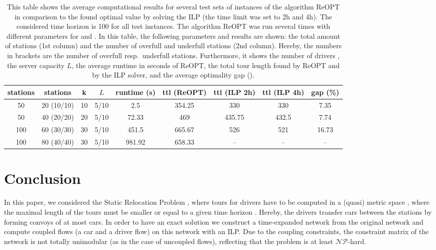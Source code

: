 \documentclass[english]{llncs}
\numberwithin{sublemma}{lemma}
\newcommand{\capd}{\ensuremath{L}}
\newcommand{\NPhard}{\ensuremath{\mathcal{NP}}\hbox{-}hard}
\begin{document}
\begin{table}
 \centering
 \caption{
    This table shows the average computational results for several test sets of instances of the algorithm ReOPT in comparison to the found optimal value by solving the ILP (the time limit was set to 2h and 4h).
    The considered time horizon is 100 for all test instances.
    The algorithm ReOPT was run several times with different parameters for  and .
    In this table, the following parameters and results are shown: the total amount of stations (1st column) and the number of overfull and underfull stations (2nd column).
    Hereby, the numbers in brackets are the number of overfull resp.~underfull stations.
    Furthermore, it shows the number of drivers , the server capacity \capd, the average runtime in seconds of ReOPT,
    the total tour length found by ReOPT and by the ILP solver, and the average optimality gap ().
 }
 \label{tab: computational results}
\begin{tabular}{c|c|c|c|c|c|c|c|c}
 stations & stations & k  & \capd  & runtime (s) & ttl (ReOPT) & ttl (ILP 2h) & ttl (ILP 4h) & gap (\%)  \\ \hline
 50       & 20 (10/10)    & 10 & 5/10 & 2.5        & 354.25      & 330      & 330      & 7.35      \\
 50       & 40 (20/20)    & 20 & 5/10 & 72.33      & 469         & 435.75   & 432.5    & 7.74      \\
 100      & 60 (30/30)    & 30 & 5/10 & 451.5      & 665.67      & 526      & 521      & 16.73     \\
 100      & 80 (40/40)    & 30 & 5/10 & 981.92     & 658.33      & --       & --       & --
\end{tabular}
\end{table}




\section{Conclusion}
\label{seq: conclusion}


In this paper, we considered the Static Relocation Problem ,
where tours for  drivers have to be computed in a (quasi) metric space , where the maximal length of the tours must be smaller or equal to a given time horizon .
Hereby, the drivers transfer cars between the stations by forming convoys of at most  cars.
In order to have an exact solution we construct a time-expanded network  from the original network  and compute coupled flows (a car and a driver flow) on this network with an ILP.
Due to the coupling constraints, the constraint matrix of the network is not totally unimodular (as in the case of uncoupled flows),
reflecting that the problem is at least \NPhard.
\end{document}
